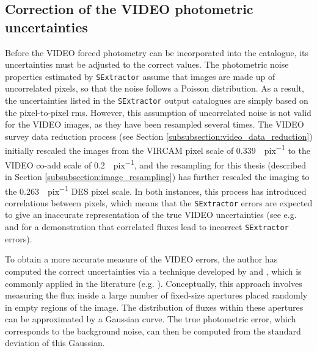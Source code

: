 \subsection{Correction of the VIDEO photometric uncertainties}\label{subsection:errors}
Before the VIDEO forced photometry can be incorporated into the \DESVIDEO catalogue, its uncertainties must be adjusted to the correct values. The photometric noise properties estimated by \texttt{SExtractor} assume that images are made up of uncorrelated pixels, so that the noise follows a Poisson distribution. As a result, the uncertainties listed in the \texttt{SExtractor} output catalogues are simply based on the pixel-to-pixel rms. However, this assumption of uncorrelated noise is not valid for the VIDEO images, as they have been resampled several times. The VIDEO survey data reduction process (see Section \ref{subsubsection:video_data_reduction}) initially rescaled the images from the VIRCAM pixel scale of \SI{0.339}{\arcsec.pix^{-1}} to the VIDEO co-add scale of \SI{0.2}{\arcsec.pix^{-1}}, and the resampling for this thesis (described in Section \ref{subsubsection:image_resampling}) has further rescaled the imaging to the \SI{0.263}{\arcsec.pix^{-1}} DES pixel scale. In both instances, this process has introduced correlations between pixels, which means that the  \texttt{SExtractor} errors are expected to give an inaccurate representation of the true VIDEO uncertainties (see e.g.  \citealt{2003AJ....125.1107L} and \citealt{2006ApJS..162....1G} for a demonstration that correlated fluxes lead to incorrect \texttt{SExtractor} errors). \par

 

To obtain a more accurate measure of the VIDEO errors, the author has computed the correct uncertainties via a technique developed by \cite{2003AJ....125.1107L} and \cite{2006ApJS..162....1G}, which is commonly applied in the literature (e.g. \citealt{2007AJ....134.1103Q,2011ApJ...735...86W,2013ApJS..206....8M,2013MNRAS.428.1281J}). Conceptually, this approach involves measuring the flux inside a large number of  fixed-size apertures placed randomly in empty regions of the image. The distribution of fluxes within these apertures can be approximated by a Gaussian curve. The true photometric error, which corresponds to the  background noise, can then be computed from the standard deviation of this Gaussian. \par 

